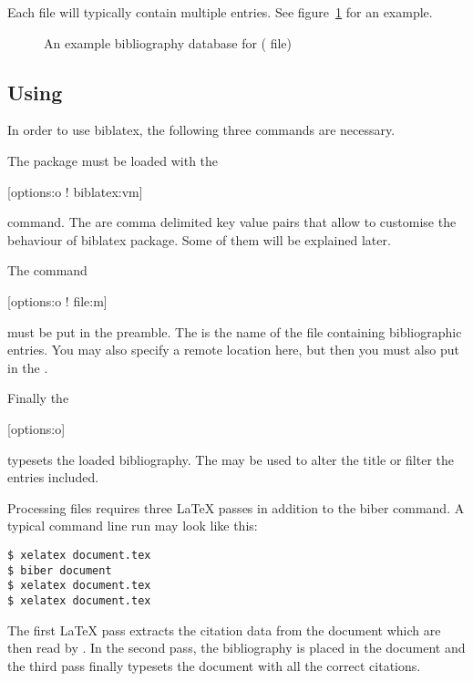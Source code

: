 Each  file will typically contain multiple entries. See
figure~\ref{fig:bibfile} for an example.

\begin{figure}[htp]
  \begin{lined}{\textwidth}
    
  \end{lined}
  \caption[An example of bibliography database]{An example bibliography
    database for  ( file)}\label{fig:bibfile}
\end{figure}

\subsection{Using }

In order to use biblatex, the following three commands are necessary.

The  package must be loaded with the
\begin{lscommand}
  [options:o ! biblatex:vm]
\end{lscommand}
command. The  are comma delimited key value pairs that allow to
customise the behaviour of biblatex package. Some of them will be explained
later.

The command
\begin{lscommand}
  [options:o ! file:m]
\end{lscommand}
must be put in the preamble. The  is the name of the  file
containing bibliographic entries. You may also specify a remote location here,
but then you must also put  in the .

Finally the
\begin{lscommand}
  [options:o]
\end{lscommand}
typesets the loaded bibliography. The  may be used to alter the
title or filter the entries included.

Processing files requires three \LaTeX{} passes in addition to the biber
command. A typical command line run may look like this:
\begin{code}
\begin{verbatim}
$ xelatex document.tex
$ biber document
$ xelatex document.tex
$ xelatex document.tex
\end{verbatim}
\end{code}
The first \LaTeX{} pass extracts the citation data from the document which are
then read by . In the second pass, the bibliography is placed in the
document and the third pass finally typesets the document with all the correct citations.

